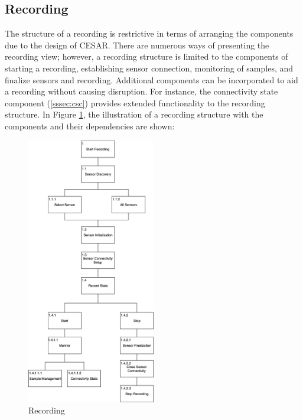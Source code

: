 
\subsection{Recording}
The structure of a recording is restrictive in terms of arranging the components due to the design of CESAR. There are numerous ways of presenting the recording view; however, a recording structure is limited to the components of starting a recording, establishing sensor connection, monitoring of samples, and finalize sensors and recording. Additional components can be incorporated to aid a recording without causing disruption. For instance, the connectivity state component (\ref{sssec:csc}) provides extended functionality to the recording structure. In Figure \ref{fig:hta_recording}, the illustration of a recording structure with the components and their dependencies are shown:

\begin{figure}
    \centering
    \includegraphics[width=0.5\textwidth]{images/Recording.png}
    \caption{Recording}
    \label{fig:hta_recording}
\end{figure}

